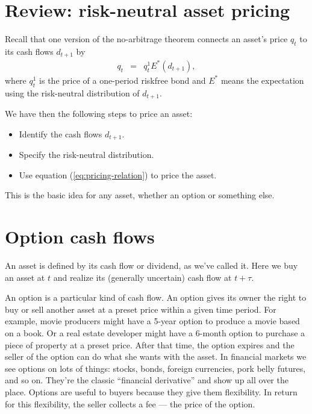 \documentclass[11pt]{article}
\begin{document}
\section{Review:  risk-neutral asset pricing}
\label{sec:review}

Recall that one version of the no-arbitrage theorem connects an asset's price $q_t$
to its cash flows $d_{t+1}$ by
\begin{eqnarray}
    q_t &=& q^1_t E^* \left( d_{t+1} \right) ,
    \label{eq:pricing-relation}
\end{eqnarray}
where $q^1_t$ is the price of a one-period riskfree bond
and $E^*$ means the expectation using the risk-neutral distribution
of $d_{t+1}$.

We have then the following steps to price an asset:
\begin{itemize}
\item Identify the cash flows $d_{t+1}$.
\item Specify the risk-neutral distribution.
\item Use equation (\ref{eq:pricing-relation}) to price the asset.
\end{itemize}
This is the basic idea for any asset,
whether an option or something else.


\section{Option cash flows}

An asset is defined by its cash flow or dividend, as we've called it.
Here we buy an asset at $t$ and realize its (generally uncertain) cash flow at $t+\tau$.

An option is a particular kind of cash flow.
An option gives its owner the right to buy or sell another asset at a preset price
within a given time period.
For example, movie producers might have a 5-year option to produce a
movie based on a book.
Or a real estate developer might have a 6-month option to purchase
a piece of property at a preset price.
After that time, the option expires and
the seller of the option can do what she wants with the asset.
In financial markets we see options on lots of things:  stocks, bonds,
foreign currencies, pork belly futures, and so on.
They're the classic ``financial derivative'' and show up all over the place.
Options are useful to buyers because they give them flexibility.
In return for this flexibility, the seller collects a fee --- the price
of the option.
\end{document}

